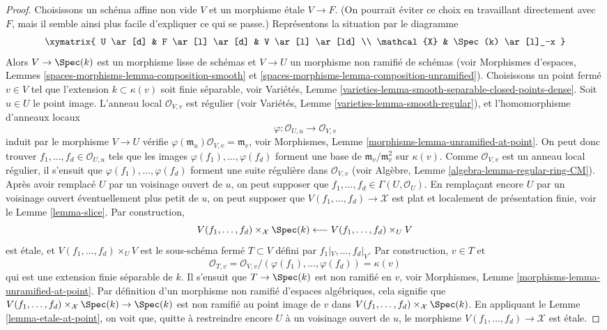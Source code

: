 \begin{proof}
\medskip\noindent
Choisissons un schéma affine non vide $V$ et un morphisme étale $V \to F$.
(On pourrait éviter ce choix en travaillant directement avec $F$, mais il
semble ainsi plus facile d'expliquer ce qui se passe.) Représentons la
situation par le diagramme
$$
\xymatrix{
U \ar[d] & F  \ar[l] \ar[d] & V \ar[l] \ar[ld] \\
\mathcal{X} & \Spec(k) \ar[l]_-x
}
$$
Alors $V \to \Spec(k)$ est un morphisme lisse de schémas et $V \to U$ un
morphisme non ramifié de schémas (voir Morphismes d'espaces, Lemmes
\ref{spaces-morphisms-lemma-composition-smooth} et
\ref{spaces-morphisms-lemma-composition-unramified}).
Choisissons un point fermé $v \in V$ tel que l'extension
$k \subset \kappa(v)$ soit finie séparable, voir Variétés,
Lemme \ref{varieties-lemma-smooth-separable-closed-points-dense}.
Soit $u \in U$ le point image. L'anneau local $\mathcal{O}_{V, v}$ est
régulier (voir Variétés, Lemme \ref{varieties-lemma-smooth-regular}), et
l'homomorphisme d'anneaux locaux
$$
\varphi : \mathcal{O}_{U, u} \longrightarrow \mathcal{O}_{V, v}
$$
induit par le morphisme $V \to U$ vérifie
$\varphi(\mathfrak m_u)\mathcal{O}_{V, v} = \mathfrak m_v$,
voir Morphismes, Lemme \ref{morphisms-lemma-unramified-at-point}.
On peut donc trouver $f_1, \ldots, f_d \in \mathcal{O}_{U, u}$ tels que les
images $\varphi(f_1), \ldots, \varphi(f_d)$ forment une base de
$\mathfrak m_v/\mathfrak m_v^2$ sur $\kappa(v)$.
Comme $\mathcal{O}_{V, v}$ est un anneau local régulier, il s'ensuit que
$\varphi(f_1), \ldots, \varphi(f_d)$ forment une suite régulière dans
$\mathcal{O}_{V, v}$ (voir Algèbre,
Lemme \ref{algebra-lemma-regular-ring-CM}).
Après avoir remplacé $U$ par un voisinage ouvert de $u$, on peut supposer que
$f_1, \ldots, f_d \in \Gamma(U, \mathcal{O}_U)$. En remplaçant encore $U$
par un voisinage ouvert éventuellement plus petit de $u$, on peut supposer que
$V(f_1, \ldots, f_d) \to \mathcal{X}$ est plat et localement de présentation
finie, voir le Lemme \ref{lemma-slice}.
Par construction,
$$
V(f_1, \ldots, f_d) \times_\mathcal{X} \Spec(k)
\longleftarrow
V(f_1, \ldots, f_d) \times_U V
$$
est étale, et $V(f_1, \ldots, f_d) \times_U V$ est le sous-schéma fermé
$T \subset V$ défini par $f_1|_V, \ldots, f_d|_V$.
Par construction, $v \in T$ et
$$
\mathcal{O}_{T, v} =
\mathcal{O}_{V, v}/(\varphi(f_1), \ldots, \varphi(f_d)) = \kappa(v)
$$
qui est une extension finie séparable de $k$. Il s'ensuit que
$T \to \Spec(k)$ est non ramifié en $v$, voir Morphismes,
Lemme \ref{morphisms-lemma-unramified-at-point}.
Par définition d'un morphisme non ramifié d'espaces algébriques, cela signifie
que $V(f_1, \ldots, f_d) \times_\mathcal{X} \Spec(k) \to \Spec(k)$ est non
ramifié au point image de $v$ dans
$V(f_1, \ldots, f_d) \times_\mathcal{X} \Spec(k)$.
En appliquant le Lemme \ref{lemma-etale-at-point}, on voit que, quitte à
restreindre encore $U$ à un voisinage ouvert de $u$, le morphisme
$V(f_1, \ldots, f_d) \to \mathcal{X}$ est étale.


\end{proof}

